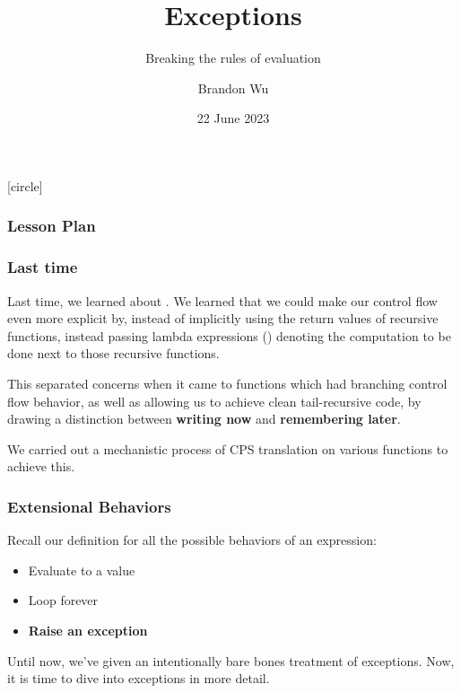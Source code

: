 \documentclass[aspectratio=169, handout]{beamer}
\title{Exceptions} %
\subtitle{Breaking the rules of evaluation} %
\date{22 June 2023} %
\author{Brandon Wu} %
\newif\ifcolorlambda
\begin{document}
\ifweb
    \renewcommand{\pause}{}
\fi

[circle]

{
\begin{frame}[plain]
    \colorlambdatrue
    \titlepage
\end{frame}
}


\begin{frame}[fragile]
  \frametitle{Lesson Plan}

  \tableofcontents
\end{frame}

\begin{frame}[fragile]
  \frametitle{Last time}

  Last time, we learned about . We learned that
  we could make our control flow even more explicit by, instead of implicitly
  using the return values of recursive functions, instead passing lambda expressions
  () denoting the computation to be done next to those recursive functions.

  \pause
  \vspace{\fill}

  This separated concerns when it came to functions which had branching control
  flow behavior, as well as allowing us to achieve clean tail-recursive code,
  by drawing a distinction between \textbf{writing now} and \textbf{remembering later}.

  \pause
  \vspace{\fill}

  We carried out a mechanistic process of CPS translation on various functions to
  achieve this.
\end{frame}


\begin{frame}[fragile]
  \frametitle{Extensional Behaviors}

  Recall our definition for all the possible behaviors of an expression: \pause
  \begin{itemize}
    \item Evaluate to a value \pause
    \item Loop forever \pause
    \item \textbf{Raise an exception}
  \end{itemize}

  \pause
  \vspace{\fill}

  Until now, we've given an intentionally bare bones treatment of
  exceptions. Now, it is time to dive into exceptions in more detail.
\end{frame}
\end{document}

